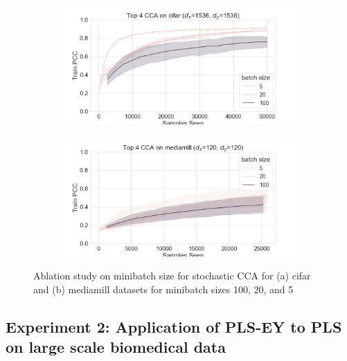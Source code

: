 \begin{figure}[h]
    \centering
    \begin{subfigure}[b]{0.49\textwidth}
        \centering
        \includegraphics[width=\textwidth]{figures/gradient_descent/CCA/cifar_minibatch_size_ablation.png}
        \caption{}
        \label{fig:cifar_minibatch_ablation}
    \end{subfigure}
    \begin{subfigure}[b]{0.49\textwidth}
        \centering
        \includegraphics[width=\textwidth]{figures/gradient_descent/CCA/mediamill_minibatch_size_ablation.png}
        \caption{}
        \label{fig:mediamill_minibatch_ablation}
    \end{subfigure}
    \caption{Ablation study on minibatch size for stochastic CCA for (a) cifar and (b) mediamill datasets for minibatch sizes 100, 20, and 5}
    \label{fig:minibatch size ablation}
\end{figure}



\subsection{Experiment 2: Application of PLS-EY to PLS on large scale biomedical data}

